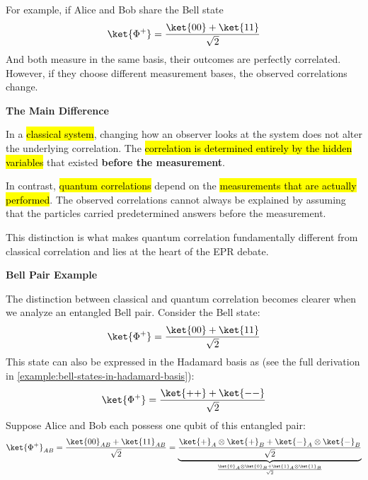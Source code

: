 \highspace
\begin{examplebox}
    For example, if Alice and Bob share the Bell state
    \begin{equation*}
        \ket{\Phi^+}
        =
        \frac{\ket{00}+\ket{11}}{\sqrt2}
    \end{equation*}
    And both measure in the same basis, their outcomes are perfectly correlated. However, if they choose different measurement bases, the observed correlations change.
\end{examplebox}

\highspace
\begin{flushleft}
    \textcolor{DarkOrange3}{ \textbf{The Main Difference}}
\end{flushleft}
In a \hl{classical system}, changing how an observer looks at the system does not alter the underlying correlation. The \hl{correlation is determined entirely by the hidden variables} that existed \textbf{before the measurement}.

\highspace
In contrast, \hl{quantum correlations} depend on the \hl{measurements that are actually performed}. The observed correlations cannot always be explained by assuming that the particles carried predetermined answers before the measurement.

\highspace
This distinction is what makes quantum correlation fundamentally different from classical correlation and lies at the heart of the EPR debate.

\highspace
\begin{flushleft}
    \textcolor{Green3}{ \textbf{Bell Pair Example}}
\end{flushleft}
The distinction between classical and quantum correlation becomes clearer when we analyze an entangled Bell pair. Consider the Bell state:
\begin{equation*}
    \ket{\Phi^+}
    =
    \frac{\ket{00}+\ket{11}}{\sqrt{2}}
\end{equation*}
This state can also be expressed in the Hadamard basis as (see the full derivation in \autoref{example:bell-states-in-hadamard-basis}):
\begin{equation*}
    \ket{\Phi^+}
    =
    \frac{\ket{++}+\ket{--}}{\sqrt{2}}
\end{equation*}
Suppose Alice and Bob each possess one qubit of this entangled pair:
\begin{equation*}
    \ket{\Phi^+}_{AB}
    =
    \frac{\ket{00}_{AB}+\ket{11}_{AB}}{\sqrt{2}}
    =
    \underbrace{\frac{\ket{+}_{A} \otimes \ket{+}_{B}+\ket{-}_{A} \otimes \ket{-}_{B}}{\sqrt{2}}}_{\frac{\ket{0}_{A} \otimes \ket{0}_{B} + \ket{1}_{A} \otimes \ket{1}_{B}}{\sqrt{2}}}
\end{equation*}


